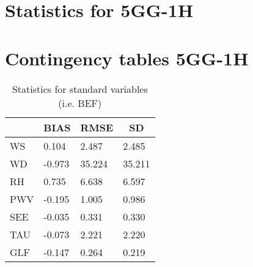 \documentclass[11pt,english]{article}
\begin{document}
\section{Statistics for 5GG-1H}
\clearpage
\section{Contingency tables 5GG-1H}
\newpage
\begin{table}[]
\begin{center}
\begin{tabular}{|l|l|l|l|}
\hline
                            & \multicolumn{1}{c|}{\cellcolor[HTML]{C0C0C0}\textbf{BIAS}} & \multicolumn{1}{c|}{\cellcolor[HTML]{C0C0C0}\textbf{RMSE}} & \multicolumn{1}{c|}{\cellcolor[HTML]{C0C0C0}\textbf{SD}} \\\hline
\cellcolor[HTML]{C0C0C0}WS  &     0.104                                &     2.487                                &     2.485                                \\
\cellcolor[HTML]{C0C0C0}WD  &    -0.973                                &    35.224                                &    35.211                                \\
\cellcolor[HTML]{C0C0C0}RH  &     0.735                                &     6.638                                &     6.597                                \\
\cellcolor[HTML]{C0C0C0}PWV &    -0.195                               &     1.005                               &     0.986                               \\
\cellcolor[HTML]{C0C0C0}SEE &    -0.035                               &     0.331                               &     0.330                               \\
\cellcolor[HTML]{C0C0C0}TAU &    -0.073                               &     2.221                               &     2.220                               \\
\cellcolor[HTML]{C0C0C0}GLF &    -0.147                               &     0.264                               &     0.219                               \\
\hline
\end{tabular}
\caption{Statistics for standard variables (i.e. BEF)}
\end{center}
\end{table}
\clearpage
\end{document}
